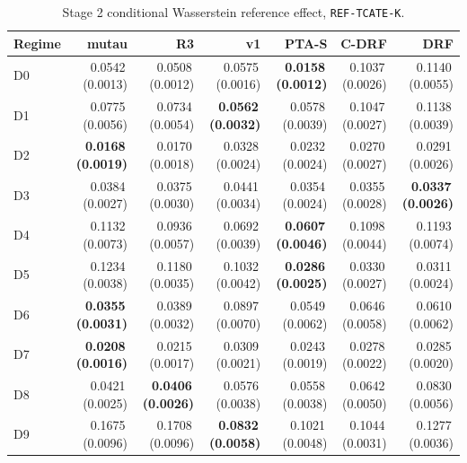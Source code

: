\begin{table}[htbp]
\centering
\caption{Stage 2 conditional Wasserstein reference effect, \texttt{REF-TCATE-K}.}
\label{tab:p55s2-reftcate}
\scriptsize
\setlength{\tabcolsep}{3.2pt}
\begin{tabular}{@{}lrrrrrr@{}}
\toprule
Regime & mutau & R3 & v1 & PTA-S & C-DRF & DRF \\
\midrule
D0 & 0.0542\,(0.0013) & 0.0508\,(0.0012) & 0.0575\,(0.0016) & \textbf{0.0158\,(0.0012)} & 0.1037\,(0.0026) & 0.1140\,(0.0055) \\
D1 & 0.0775\,(0.0056) & 0.0734\,(0.0054) & \textbf{0.0562\,(0.0032)} & 0.0578\,(0.0039) & 0.1047\,(0.0027) & 0.1138\,(0.0039) \\
D2 & \textbf{0.0168\,(0.0019)} & 0.0170\,(0.0018) & 0.0328\,(0.0024) & 0.0232\,(0.0024) & 0.0270\,(0.0027) & 0.0291\,(0.0026) \\
D3 & 0.0384\,(0.0027) & 0.0375\,(0.0030) & 0.0441\,(0.0034) & 0.0354\,(0.0024) & 0.0355\,(0.0028) & \textbf{0.0337\,(0.0026)} \\
D4 & 0.1132\,(0.0073) & 0.0936\,(0.0057) & 0.0692\,(0.0039) & \textbf{0.0607\,(0.0046)} & 0.1098\,(0.0044) & 0.1193\,(0.0074) \\
D5 & 0.1234\,(0.0038) & 0.1180\,(0.0035) & 0.1032\,(0.0042) & \textbf{0.0286\,(0.0025)} & 0.0330\,(0.0027) & 0.0311\,(0.0024) \\
D6 & \textbf{0.0355\,(0.0031)} & 0.0389\,(0.0032) & 0.0897\,(0.0070) & 0.0549\,(0.0062) & 0.0646\,(0.0058) & 0.0610\,(0.0062) \\
D7 & \textbf{0.0208\,(0.0016)} & 0.0215\,(0.0017) & 0.0309\,(0.0021) & 0.0243\,(0.0019) & 0.0278\,(0.0022) & 0.0285\,(0.0020) \\
D8 & 0.0421\,(0.0025) & \textbf{0.0406\,(0.0026)} & 0.0576\,(0.0038) & 0.0558\,(0.0038) & 0.0642\,(0.0050) & 0.0830\,(0.0056) \\
D9 & 0.1675\,(0.0096) & 0.1708\,(0.0096) & \textbf{0.0832\,(0.0058)} & 0.1021\,(0.0048) & 0.1044\,(0.0031) & 0.1277\,(0.0036) \\
\bottomrule
\end{tabular}
\end{table}

